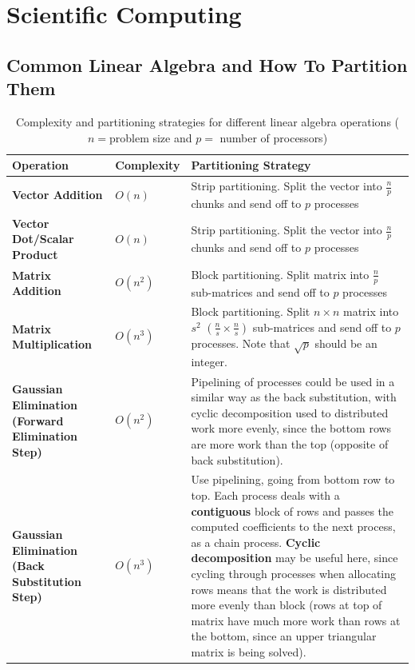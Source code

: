 \documentclass{article}
\begin{document}
\section{Scientific Computing}

\subsection{Common Linear Algebra and How To Partition Them}

\begin{table}[H]
	\centering
	\begin{tabular}{|p{5cm}|p{2cm}|p{9cm}|}
	\hline
	\textbf{Operation} & \textbf{Complexity} & \textbf{Partitioning Strategy} \\
	\hline
	\textbf{Vector Addition} & $O(n)$ & Strip partitioning. Split the vector into $\frac{n}{p}$ chunks and send off to $p$ processes\\
	\textbf{Vector Dot/Scalar Product} & $O(n)$ & Strip partitioning. Split the vector into $\frac{n}{p}$ chunks and send off to $p$ processes\\
	\textbf{Matrix Addition} & $O(n^2)$ & Block partitioning. Split matrix into $\frac{n}{p}$ sub-matrices and send off to $p$ processes \\
	\textbf{Matrix Multiplication} & $O(n^3)$ & Block partitioning. Split $n \times n$ matrix into $s^2$ $(\frac{n}{s} \times \frac{n}{s})$ sub-matrices and send off to $p$ processes. Note that $\sqrt{p}$ should be an integer. \\
	\textbf{Gaussian Elimination (Forward Elimination Step)} & $O(n^2)$ &  Pipelining of processes could be used in a similar way as the back substitution, with cyclic decomposition used to distributed work more evenly, since the bottom rows are more work than the top (opposite of back substitution). \\
	\textbf{Gaussian Elimination (Back Substitution Step)} & $O(n^3)$ &  Use pipelining, going from bottom row to top. Each process deals with a \textbf{contiguous} block of rows and passes the computed coefficients to the next process, as a chain process. \textbf{Cyclic decomposition} may be useful here, since cycling through processes when allocating rows means that the work is distributed more evenly than block (rows at top of matrix have much more work than rows at the bottom, since an upper triangular matrix is being solved). \\
	\hline
	\end{tabular}
	\caption{Complexity and partitioning strategies for different linear algebra operations ($n= $problem size and $p= $ number of processors)}
\end{table}
\end{document}
